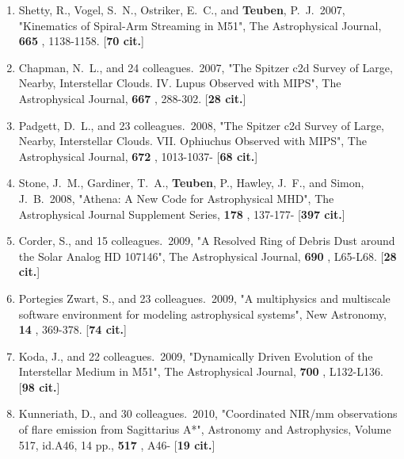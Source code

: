 \documentclass[11pt,letterpaper]{article}
\begin{document}
\begin{enumerate}[label=\textbf{\arabic*}.]
\item  
Shetty, R., Vogel, S.~N., Ostriker, E.~C., and {\bf Teuben}, P.~J.\  2007,  
"Kinematics of Spiral-Arm Streaming in M51", The Astrophysical Journal,  
{\bf 665} , 1138-1158.  [{\bf 70 cit.}] 

\item  
Chapman, N.~L., and 24 colleagues.\  2007,  "The Spitzer c2d Survey of 
Large, Nearby, Interstellar Clouds. IV. Lupus Observed with MIPS", The 
Astrophysical Journal,  {\bf 667} , 288-302.  [{\bf 28 cit.}] 


\item  
Padgett, D.~L., and 23 colleagues.\  2008,  "The Spitzer c2d Survey of 
Large, Nearby, Interstellar Clouds. VII. Ophiuchus Observed with MIPS", The 
Astrophysical Journal,  {\bf 672} , 1013-1037- [{\bf 68 cit.}] 

\item  
Stone, J.~M., Gardiner, T.~A., {\bf Teuben}, P., Hawley, J.~F., and Simon, 
J.~B.\  2008,  "Athena: A New Code for Astrophysical MHD", The 
Astrophysical Journal Supplement Series,  {\bf 178} , 137-177- [{\bf 397 
cit.}] 

\item  
Corder, S., and 15 colleagues.\  2009,  "A Resolved Ring of Debris Dust 
around the Solar Analog HD 107146", The Astrophysical Journal,  {\bf 690} , 
L65-L68.  [{\bf 28 cit.}] 

\item  
Portegies Zwart, S., and 23 colleagues.\  2009,  "A multiphysics and 
multiscale software environment for modeling astrophysical systems", New 
Astronomy,  {\bf 14} , 369-378.  [{\bf 74 cit.}] 

\item  
Koda, J., and 22 colleagues.\  2009,  "Dynamically Driven Evolution of the 
Interstellar Medium in M51", The Astrophysical Journal,  {\bf 700} , 
L132-L136.  [{\bf 98 cit.}] 

\item  
Kunneriath, D., and 30 colleagues.\  2010,  "Coordinated NIR/mm 
observations of flare emission from Sagittarius A*", Astronomy and 
Astrophysics, Volume 517, id.A46, 14 pp.,  {\bf 517} , A46- [{\bf 19 cit.}] 


\end{enumerate}
\end{document}
